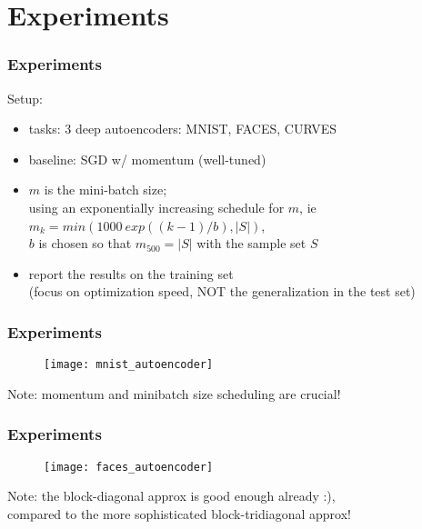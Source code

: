 \section{Experiments}

\begin{frame}
\frametitle{Experiments}
Setup:
\begin{itemize}
    \item tasks: 3 deep autoencoders: MNIST, FACES, CURVES
    \item baseline: SGD w/ momentum (well-tuned)
    \item $m$ is the mini-batch size;\\
          using an exponentially increasing schedule for $m$, ie
          $m_k = min(1000~exp((k - 1)/b), |S|)$,\\
            $b$ is chosen so that $m_{500} = |S|$ with the sample set $S$
    \item report the results on the training set \\
          (focus on optimization speed, NOT the generalization in the test set)
\end{itemize}
\end{frame}

\begin{frame}
\frametitle{Experiments}
\begin{figure}
    \centering
    \texttt{[image: mnist\_autoencoder]}
\end{figure}
Note: momentum and minibatch size scheduling are crucial!
\end{frame}

\begin{frame}
\frametitle{Experiments}
\begin{figure}
    \centering
    \texttt{[image: faces\_autoencoder]}
\end{figure}
Note: the block-diagonal approx is good enough already :), \\
compared to the more sophisticated block-tridiagonal approx!
\end{frame}
